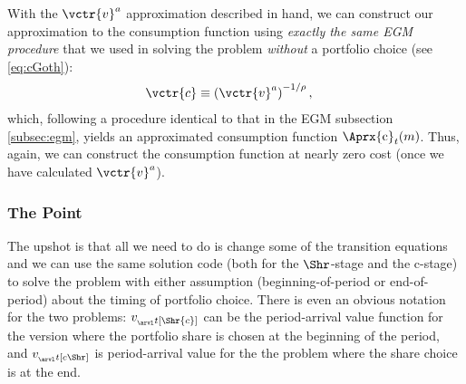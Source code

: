 \documentclass[titlepage, headings=optiontotocandhead]{Resources/texmf-local/tex/latex/econtex}
\begin{document}
With the $\vctr{v}^{a}$ approximation described in hand, we can construct our approximation to the consumption function using \emph{exactly the same EGM procedure} that we used in solving the problem \emph{without} a portfolio choice (see \eqref{eq:cGoth}):
\begin{equation}\begin{gathered}\begin{aligned}
      \vctr{c}  & \equiv  \left(\vctr{v}^{a}\right)^{-1/\rho} \label{eq:cVecPort},
    \end{aligned}\end{gathered}\end{equation}
which, following a procedure identical to that in the EGM subsection \ref{subsec:egm}, yields an approximated consumption function $\Aprx{\mathrm{c}}_{t}(m)$.  Thus, again, we can construct the consumption function at nearly zero cost (once we have calculated $\vctr{v}^{a}$).

\hypertarget{the-point}{}

\subsubsection{The Point}\label{subsubsec:the-point}

The upshot is that all we need to do is change some of the transition equations and we can use the same solution code (both for the $\Shr$-stage and the $\mathrm{c}$-stage) to solve the problem with either assumption (beginning-of-period or end-of-period) about the timing of portfolio choice.  There is even an obvious notation for the two problems: $v_{_\arvl t[\Shr{c}]}$ can be the {period}-arrival value function for the version where the portfolio share is chosen at the beginning of the period, and $v_{_\arvl t[{c}\Shr]}$ is {period}-arrival value for the the problem where the share choice is at the end.
\end{document}
